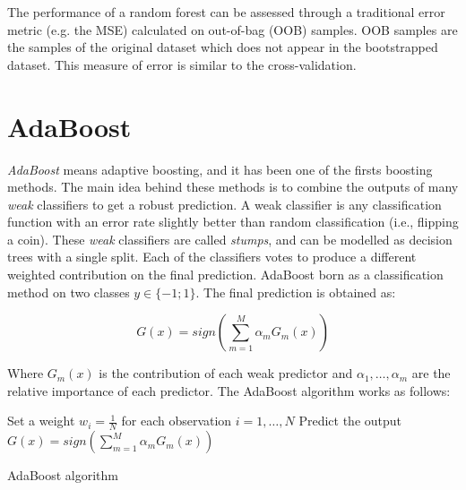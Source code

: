 The performance of a random forest can be assessed through a traditional error metric (e.g. the MSE) calculated on out-of-bag (OOB) samples. OOB samples are the samples of the original dataset which does not appear in the bootstrapped dataset. This measure of error is similar to the cross-validation.

\section{AdaBoost}
\textit{AdaBoost} means adaptive boosting, and it has been one of the firsts boosting methods. The main idea behind these methods is to combine the outputs of many \textit{weak} classifiers to get a robust prediction. A weak classifier is any classification function with an error rate slightly better than random classification (i.e., flipping a coin). These \textit{weak} classifiers are called \textit{stumps}, and can be modelled as decision trees with a single split. Each of the classifiers votes to produce a different weighted contribution on the final prediction. AdaBoost born as a classification method on two classes $y\in\{-1;1\}$. The final prediction is obtained as:

\begin{equation}
G\left(x\right)=sign\left(\sum_{m=1}^{M}{\alpha_mG_m\left(x\right)}\right)
\label{eq_adaboost}
\end{equation}

Where $G_m(x)$ is the contribution of each weak predictor and $\alpha_1,\ldots,\alpha_m$ are the relative importance of each predictor. The AdaBoost algorithm works as follows:

\begin{algorithm}[H]
\DontPrintSemicolon
\SetAlgoLined

	Set a weight $w_i=\frac{1}{N}$ for each observation $i=1,\ldots,N$ \;
	Predict the output $G\left(x\right)=sign\left(\sum_{m=1}^{M}{\alpha_mG_m\left(x\right)}\right)$ \; 


\caption{AdaBoost algorithm}
\label{algo_adaboost}
\end{algorithm}

